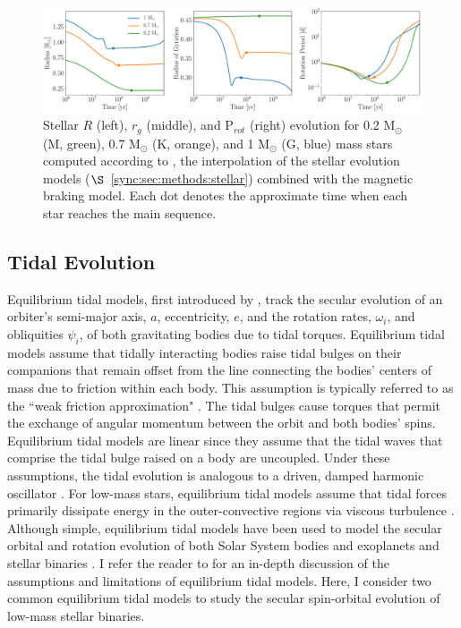 
\begin{figure}
	\includegraphics[width=\columnwidth]{stellarExample.pdf}
   \caption{Stellar $R$ (left), $r_g$ (middle), and P$_{rot}$ (right) evolution for 0.2 M$_{\odot}$ (M, green), 0.7 M$_{\odot}$ (K, orange), and 1 M$_{\odot}$ (G, blue) mass stars computed according to \stellar, the interpolation of the \citet{Baraffe2015} stellar evolution models ($\S$~\ref{sync:sec:methods:stellar}) combined with the \citet{Matt2015} magnetic braking model. Each dot denotes the approximate time when each star reaches the main sequence.}%
    \label{sync:fig:stellarExample}%
\end{figure}

\subsection{Tidal Evolution} \label{sync:sec:methods:eqtide}

 Equilibrium tidal models, first introduced by \citet{Darwin1880}, track the secular evolution of an orbiter's semi-major axis, $a$, eccentricity, $e$, and the rotation rates, $\omega_i$, and obliquities $\psi_i$, of both gravitating bodies due to tidal torques. Equilibrium tidal models assume that tidally interacting bodies raise tidal bulges on their companions that remain offset from the line connecting the bodies' centers of mass due to friction within each body. This assumption is typically referred to as the ``weak friction approximation" \citep{Zahn2008}.  The tidal bulges cause torques that permit the exchange of angular momentum between the orbit and both bodies' spins. Equilibrium tidal models are linear since they assume that the tidal waves that comprise the tidal bulge raised on a body are uncoupled. Under these assumptions, the tidal evolution is analogous to a driven, damped harmonic oscillator \citep{Greenberg2009}. For low-mass stars, equilibrium tidal models assume that tidal forces primarily dissipate energy in the outer-convective regions via viscous turbulence \citep[see][]{Zahn2008}. Although simple, equilibrium tidal models have been used to model the secular orbital and rotation evolution of both Solar System bodies and exoplanets \citep[e.g.][]{Goldreich1966,Jackson2009,Leconte2010,Heller2011,Barnes2013,Barnes2017} and stellar binaries \citep[e.g.][]{Zahn1989,Zahn2008,Khaliullin2011,Repetto2014,Fleming2018}. I refer the reader to \citet{Barnes2017} for an in-depth discussion of the assumptions and limitations of equilibrium tidal models. Here, I consider two common equilibrium tidal models to study the secular spin-orbital evolution of low-mass stellar binaries.  

